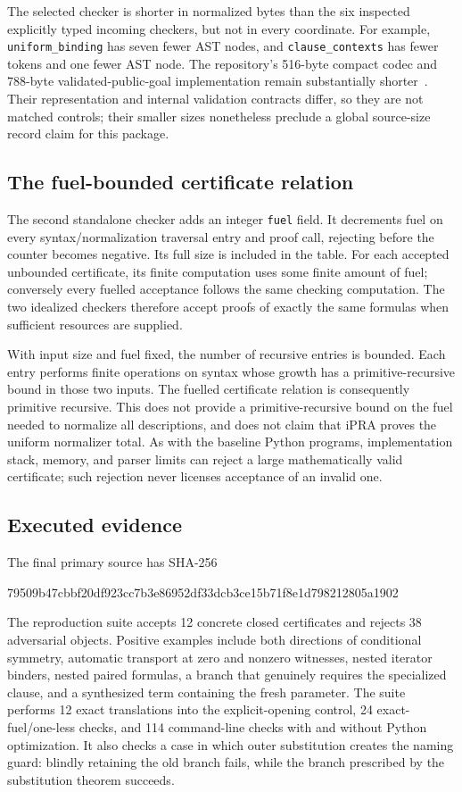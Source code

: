 The selected checker is shorter in normalized bytes than the six
inspected explicitly typed incoming checkers, but not in every coordinate.
For example, \texttt{uniform\_binding} has seven fewer AST nodes, and
\texttt{clause\_contexts} has fewer tokens and one fewer AST node.
The repository's 516-byte compact codec and 788-byte validated-public-goal
implementation remain substantially shorter~\cite{repo}. Their
representation and internal validation contracts differ, so they are
not matched controls; their smaller sizes nonetheless preclude a
global source-size record claim for this package.

\subsection{The fuel-bounded certificate relation}
The second standalone checker adds an integer \texttt{fuel} field. It
decrements fuel on every syntax/normalization traversal entry and proof
call, rejecting before the counter becomes negative. Its full size is
included in the table. For each accepted unbounded certificate, its
finite computation uses some finite amount of fuel; conversely every
fuelled acceptance follows the same checking computation. The two
idealized checkers therefore accept proofs of exactly the same formulas
when sufficient resources are supplied.

With input size and fuel fixed, the number of recursive entries is
bounded. Each entry performs finite operations on syntax whose growth
has a primitive-recursive bound in those two inputs. The fuelled
certificate relation is consequently primitive recursive. This does
not provide a primitive-recursive bound on the fuel needed to normalize
all descriptions, and does not claim that iPRA proves the uniform
normalizer total. As with the baseline Python programs, implementation
stack, memory, and parser limits can reject a large mathematically
valid certificate; such rejection never licenses acceptance of an
invalid one.

\subsection{Executed evidence}
The final primary source has SHA-256
\begin{center}\footnotesize\ttfamily
79509b47cbbf20df923cc7b3e86952df33dcb3ce15b71f8e1d798212805a1902
\end{center}
The reproduction suite accepts 12 concrete closed certificates and
rejects 38 adversarial objects. Positive examples include both directions
of conditional symmetry, automatic transport at zero and nonzero
witnesses, nested iterator binders, nested paired formulas, a branch
that genuinely requires the specialized clause, and a synthesized term
containing the fresh parameter. The suite performs 12 exact translations
into the explicit-opening control, 24 exact-fuel/one-less checks, and
114 command-line checks with and without Python optimization. It also
checks a case in which outer substitution creates the naming guard:
blindly retaining the old branch fails, while the branch prescribed by
the substitution theorem succeeds.

